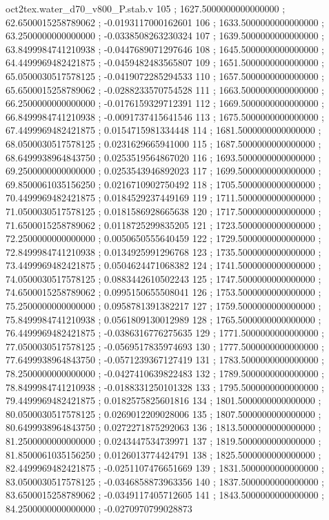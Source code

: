 \begin{filecontents}[overwrite]{oct2tex.water_d70_v800_P.stab.v}
105 ; 1627.5000000000000000 ; 62.6500015258789062 ; -0.0193117000162601
106 ; 1633.5000000000000000 ; 63.2500000000000000 ; -0.0338508263230324
107 ; 1639.5000000000000000 ; 63.8499984741210938 ; -0.0447689071297646
108 ; 1645.5000000000000000 ; 64.4499969482421875 ; -0.0459482483565807
109 ; 1651.5000000000000000 ; 65.0500030517578125 ; -0.0419072285294533
110 ; 1657.5000000000000000 ; 65.6500015258789062 ; -0.0288233570754528
111 ; 1663.5000000000000000 ; 66.2500000000000000 ; -0.0176159329712391
112 ; 1669.5000000000000000 ; 66.8499984741210938 ; -0.0091737415641546
113 ; 1675.5000000000000000 ; 67.4499969482421875 ; 0.0154715981334448
114 ; 1681.5000000000000000 ; 68.0500030517578125 ; 0.0231629665941000
115 ; 1687.5000000000000000 ; 68.6499938964843750 ; 0.0253519564867020
116 ; 1693.5000000000000000 ; 69.2500000000000000 ; 0.0253543946892023
117 ; 1699.5000000000000000 ; 69.8500061035156250 ; 0.0216710902750492
118 ; 1705.5000000000000000 ; 70.4499969482421875 ; 0.0184529237449169
119 ; 1711.5000000000000000 ; 71.0500030517578125 ; 0.0181586928665638
120 ; 1717.5000000000000000 ; 71.6500015258789062 ; 0.0118725299835205
121 ; 1723.5000000000000000 ; 72.2500000000000000 ; 0.0050650555640459
122 ; 1729.5000000000000000 ; 72.8499984741210938 ; 0.0134925991296768
123 ; 1735.5000000000000000 ; 73.4499969482421875 ; 0.0504624471068382
124 ; 1741.5000000000000000 ; 74.0500030517578125 ; 0.0883442610502243
125 ; 1747.5000000000000000 ; 74.6500015258789062 ; 0.0995150655508041
126 ; 1753.5000000000000000 ; 75.2500000000000000 ; 0.0958781391382217
127 ; 1759.5000000000000000 ; 75.8499984741210938 ; 0.0561809130012989
128 ; 1765.5000000000000000 ; 76.4499969482421875 ; -0.0386316776275635
129 ; 1771.5000000000000000 ; 77.0500030517578125 ; -0.0569517835974693
130 ; 1777.5000000000000000 ; 77.6499938964843750 ; -0.0571239367127419
131 ; 1783.5000000000000000 ; 78.2500000000000000 ; -0.0427410639822483
132 ; 1789.5000000000000000 ; 78.8499984741210938 ; -0.0188331250101328
133 ; 1795.5000000000000000 ; 79.4499969482421875 ; 0.0182575825601816
134 ; 1801.5000000000000000 ; 80.0500030517578125 ; 0.0269012209028006
135 ; 1807.5000000000000000 ; 80.6499938964843750 ; 0.0272271875292063
136 ; 1813.5000000000000000 ; 81.2500000000000000 ; 0.0243447534739971
137 ; 1819.5000000000000000 ; 81.8500061035156250 ; 0.0126013774424791
138 ; 1825.5000000000000000 ; 82.4499969482421875 ; -0.0251107476651669
139 ; 1831.5000000000000000 ; 83.0500030517578125 ; -0.0346858873963356
140 ; 1837.5000000000000000 ; 83.6500015258789062 ; -0.0349117405712605
141 ; 1843.5000000000000000 ; 84.2500000000000000 ; -0.0270970799028873

\end{filecontents}
